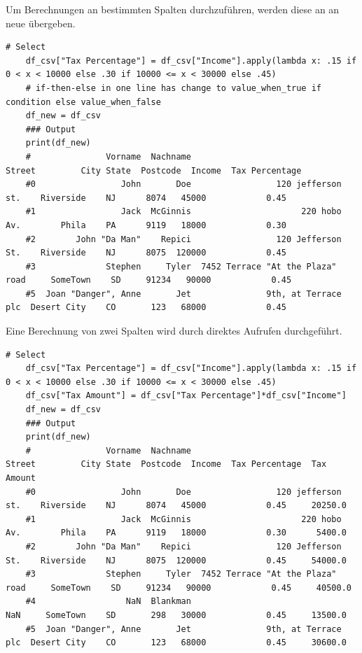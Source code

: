Um Berechnungen an bestimmten Spalten durchzuführen, werden diese an an neue übergeben.
\begin{lstlisting}[style=python]
	# Select
	df_csv["Tax Percentage"] = df_csv["Income"].apply(lambda x: .15 if 0 < x < 10000 else .30 if 10000 <= x < 30000 else .45)
	# if-then-else in one line has change to value_when_true if condition else value_when_false
	df_new = df_csv
	### Output
	print(df_new)
	#               Vorname  Nachname                            Street         City State  Postcode  Income  Tax Percentage
	#0                 John       Doe                 120 jefferson st.    Riverside    NJ      8074   45000            0.45
	#1                 Jack  McGinnis                      220 hobo Av.        Phila    PA      9119   18000            0.30
	#2        John "Da Man"    Repici                 120 Jefferson St.    Riverside    NJ      8075  120000            0.45
	#3              Stephen     Tyler  7452 Terrace "At the Plaza" road     SomeTown    SD     91234   90000            0.45
	#5  Joan "Danger", Anne       Jet               9th, at Terrace plc  Desert City    CO       123   68000            0.45
\end{lstlisting}

Eine Berechnung von zwei Spalten wird durch direktes Aufrufen durchgeführt.
\begin{lstlisting}[style=python]
	# Select
	df_csv["Tax Percentage"] = df_csv["Income"].apply(lambda x: .15 if 0 < x < 10000 else .30 if 10000 <= x < 30000 else .45)
	df_csv["Tax Amount"] = df_csv["Tax Percentage"]*df_csv["Income"]
	df_new = df_csv
	### Output
	print(df_new)
	#               Vorname  Nachname                            Street         City State  Postcode  Income  Tax Percentage  Tax Amount
	#0                 John       Doe                 120 jefferson st.    Riverside    NJ      8074   45000            0.45     20250.0
	#1                 Jack  McGinnis                      220 hobo Av.        Phila    PA      9119   18000            0.30      5400.0
	#2        John "Da Man"    Repici                 120 Jefferson St.    Riverside    NJ      8075  120000            0.45     54000.0
	#3              Stephen     Tyler  7452 Terrace "At the Plaza" road     SomeTown    SD     91234   90000            0.45     40500.0
	#4                  NaN  Blankman                               NaN     SomeTown    SD       298   30000            0.45     13500.0
	#5  Joan "Danger", Anne       Jet               9th, at Terrace plc  Desert City    CO       123   68000            0.45     30600.0
\end{lstlisting}

